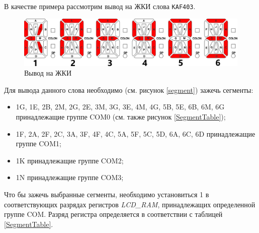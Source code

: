 В качестве примера рассмотрим вывод на ЖКИ слова \verb#KAF403#.
\begin{figure}[H]
\begin{center}
\includegraphics[scale=0.33]{Image/53.jpg} 
\end{center}
\caption{Вывод на ЖКИ}\label{kaf403}
\end{figure}
Для вывода данного слова необходимо (см. рисунок \ref{segment}) зажечь сегменты: 
\begin{itemize}
\item 1G, 1E, 2B, 2M, 2G, 2E, 3M, 3G, 3E, 4M, 4G, 5B, 5E, 6B, 6M, 6G принадлежащие группе COM0 (см. также рисунок \ref{SegmentTable});
\item 1F, 2A, 2F, 2C, 3A, 3F, 4F, 4C, 5A, 5F, 5C, 5D, 6A, 6C, 6D принадлежащие группе COM1;
\item 1K принадлежащие группе COM2;
\item 1N принадлежащие группе COM3;
\end{itemize}
Что бы зажечь выбранные сегменты, необходимо установиться 1 в соответствующих разрядах регистров \textit{LCD\_RAM}, принадлежащих определенной группе COM. Разряд регистра определяется в соответствии с таблицей \ref{SegmentTable}.  


